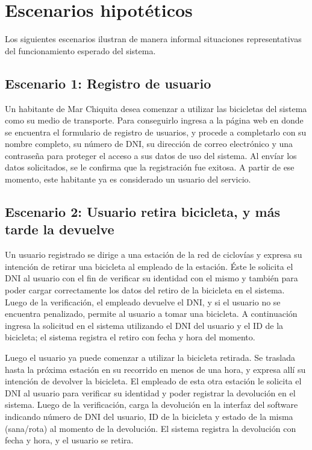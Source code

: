 \documentclass[a4paper, 10pt, twoside]{article}
\begin{document}


\section{Escenarios hipotéticos}


Los siguientes escenarios ilustran de manera informal situaciones representativas del funcionamiento esperado del sistema.


\subsection{Escenario 1: Registro de usuario}

Un habitante de Mar Chiquita desea comenzar a utilizar las bicicletas del sistema como su medio de transporte. Para conseguirlo ingresa a la página web en donde se encuentra el formulario de registro de usuarios, y procede a completarlo con su nombre completo, su número de DNI, su dirección de correo electrónico y una contraseña para proteger el acceso a sus datos de uso del sistema. Al envíar los datos solicitados, se le confirma que la registración fue exitosa. A partir de ese momento, este habitante ya es considerado un usuario del servicio.


\subsection{Escenario 2: Usuario retira bicicleta, y más tarde la devuelve}

Un usuario registrado se dirige a una estación de la red de ciclovías y expresa su intención de retirar una bicicleta al empleado de la estación. Éste le solicita el DNI al usuario con el fin de verificar su identidad con el mismo y también para poder cargar correctamente los datos del retiro de la bicicleta en el sistema. Luego de la verificación, el empleado devuelve el DNI, y si el usuario no se encuentra penalizado, permite al usuario a tomar una bicicleta. A continuación ingresa la solicitud en el sistema utilizando el DNI del usuario y el ID de la bicicleta; el sistema registra el retiro con fecha y hora del momento.

Luego el usuario ya puede comenzar a utilizar la bicicleta retirada. Se traslada hasta la próxima estación en su recorrido en menos de una hora, y expresa allí su intención de devolver la bicicleta. El empleado de esta otra estación le solicita el DNI al usuario para verificar su identidad y poder registrar la devolución en el sistema. Luego de la verificación, carga la devolución en la interfaz del software indicando número de DNI del usuario, ID de la bicicleta y estado de la misma (sana/rota) al momento de la devolución. El sistema registra la devolución con fecha y hora, y el usuario se retira.
\end{document}
